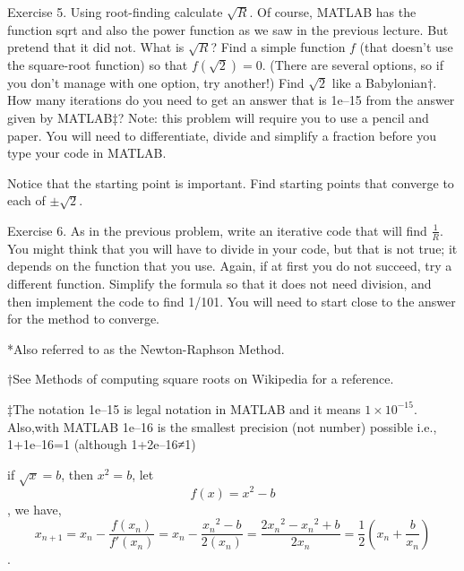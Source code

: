 \documentclass[a4paper,12pt]{article}
\begin{document}
Exercise 5. Using root-finding calculate \(\sqrt{R}\). Of course, MATLAB has the function sqrt and also the power function as we saw in the previous lecture. But pretend that it did not. What is \(\sqrt{R}\)? Find a simple function \(f\) (that doesn't use the square-root function) so that \(f(\sqrt{2})=0\). (There are several options, so if you don't manage with one option, try another!) Find \(\sqrt{2}\) like a Babylonian†. How many iterations do you need to get an answer that is 1e–15 from the answer given by MATLAB‡? Note: this problem will require you to use a pencil and paper. You will need to differentiate, divide and simplify a fraction before you type your code in MATLAB.

Notice that the starting point is important. Find starting points that converge to each of \(\pm\sqrt{2}\).

Exercise 6. As in the previous problem, write an iterative code that will find \(\frac{1}{R}\). You might think that you will have to divide in your code, but that is not true; it depends on the function that you use. Again, if at first you do not succeed, try a different function. Simplify the formula so that it does not need division, and then implement the code to find 1/101. You will need to start close to the answer for the method to converge.

*Also referred to as the Newton-Raphson Method.

†See Methods of computing square roots on Wikipedia for a reference.

‡The notation 1e–15 is legal notation in MATLAB and it means \(1\times10^{-15}\). Also,with MATLAB 1e–16 is the smallest precision (not number) possible i.e., 1+1e–16=1 (although 1+2e–16≠1)


if \(\sqrt{x}  = b\), then \({x^2} = b\),
let \[f(x) = {x^2} - b\], we have,
\[{x_{n + 1}} = {x_n} - \frac{{f({x_n})}}{{f'({x_n})}} = {x_n} - \frac{{{x_n}^2 - b}}{{2\left( {{x_n}} \right)}} = \frac{{2{x_n}^2 - {x_n}^2 + b}}{{2{x_n}}} = \frac{1}{2}\left( {{x_n} + \frac{b}{{{x_n}}}} \right)\].
\end{document}
